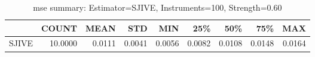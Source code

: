 \begin{table}[ht]
\centering
\caption{mse summary: Estimator=SJIVE, Instruments=100, Strength=0.60}
\begin{tabular}{lrrrrrrrr}
\toprule
 & COUNT & MEAN & STD & MIN & 25\% & 50\% & 75\% & MAX \\
\midrule
SJIVE & 10.0000 & 0.0111 & 0.0041 & 0.0056 & 0.0082 & 0.0108 & 0.0148 & 0.0164 \\
\bottomrule
\end{tabular}
\end{table}
